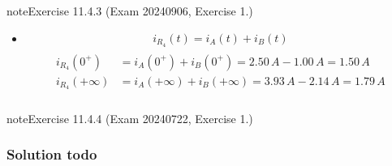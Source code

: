 \documentclass[letterpaper,10pt,english]{jupyterBook}
\begin{document}
\begin{sphinxadmonition}{note}{Exercise 11.4.3 (Exam 2024\sphinxhyphen{}09\sphinxhyphen{}06, Exercise 1.)}
\begin{itemize}
\begin{equation*}
\begin{split}
\begin{aligned}
     i_B(+\infty) & = \dfrac{1}{R_{BB}} \left( v_B(+\infty) - v_{B,0} - R_{BA} i_A(+\infty) \right) = \\
                  & = \dfrac{1}{5 \, \Omega} \left( 0 \, V  + 5 \, V - 4 \, \Omega \cdot (3.93 \, A) \right) = -2.14 \, A\\
   \end{aligned}\end{split}
\end{equation*}
\item {} 
\sphinxAtStartPar
{}
\begin{equation*}
\begin{split}i_{R_4}(t) = i_A(t) + i_B(t)\end{split}
\end{equation*}\begin{equation*}
\begin{split}\begin{aligned}
     i_{R_4}(0^+    ) & = i_A(0^+    ) + i_B(0^+    ) =   2.50 \, A - 1.00 \, A = 1.50 \, A \\
     i_{R_4}(+\infty) & = i_A(+\infty) + i_B(+\infty) =   3.93 \, A - 2.14 \, A = 1.79 \, A \\
   \end{aligned}\end{split}
\end{equation*}
\end{itemize}
\end{sphinxadmonition}
 \label{exercise:exam-24-07-22-exe-01}

\begin{sphinxadmonition}{note}{Exercise 11.4.4 (Exam 2024\sphinxhyphen{}07\sphinxhyphen{}22, Exercise 1.)}



\begin{figure}[htbp]
\centering

\noindent{}
\end{figure}
\subsubsection*{Solution \sphinxhyphen{} todo}
\end{sphinxadmonition}
 \label{exercise:exam-24-02-13-exe-01-b}
\end{document}
